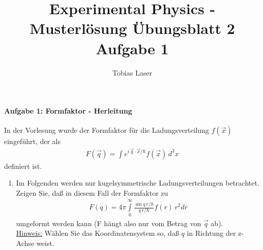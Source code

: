 \documentclass[11pt,a4paper]{scrartcl}
\begin{document}
%
\title{Experimental Physics - Musterlösung Übungsblatt 2 Aufgabe 1}
\author{Tobias Laser}
\maketitle
\vfill
\thispagestyle{empty}
%
%
\thispagestyle{empty}
%
%
\paragraph{Aufgabe 1: Formfaktor - Herleitung}
In der Vorlesung wurde der Formfaktor für die Ladungsverteilung $f(\vec{x})$ eingeführt, der als 
\begin{align*}
    F(\vec{q}) = \int e^{i \, \vec{q} \cdot \vec{x}/\hbar} f(\vec{x})\, d^3x
\end{align*}
definiert ist.
\begin{enumerate}[label=(\alph*)]
    \item Im Folgenden werden nur kugelsymmetrische Ladungsverteilungen betrachtet. Zeigen Sie, daß in diesem Fall der Formfaktor zu
    \begin{align*}
        F(q) = 4\pi\int\limits_0^\infty \frac{\sin{q \, r/\hbar}}{q \, r / \hbar} f(r) \, r^2 dr
    \end{align*}
    umgeformt werden kann (F hängt also nur vom Betrag von $\vec{q}$ ab).\\
    \underline{Hinweis:} Wählen Sie das Koordinatensystem so, daß $q$ in Richtung der z-Achse weist.
    

\end{enumerate}
\end{document}

